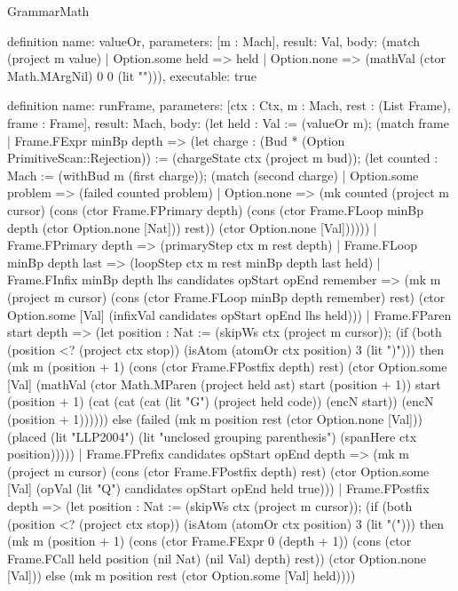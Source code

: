 \begin{lexlean}{GrammarMath}
\begin{semanticmodule}
{{{definition{
  name: valueOr,
  parameters: [m : Mach],
  result: Val,
  body: (match (project m value)
    | Option.some held => held
    | Option.none => (mathVal (ctor Math.MArgNil) 0 0 (lit ""))),
  executable: true
}

definition{
  name: runFrame,
  parameters: [ctx : Ctx, m : Mach, rest : (List Frame), frame : Frame],
  result: Mach,
  body: (let held : Val := (valueOr m); (match frame
    | Frame.FExpr minBp depth => (let charge : (Bud * (Option PrimitiveScan::Rejection)) := (chargeState ctx (project m bud)); (let counted : Mach := (withBud m (first charge)); (match (second charge)
      | Option.some problem => (failed counted problem)
      | Option.none => (mk counted (project m cursor) (cons (ctor Frame.FPrimary depth) (cons (ctor Frame.FLoop minBp depth (ctor Option.none [Nat])) rest)) (ctor Option.none [Val])))))
    | Frame.FPrimary depth => (primaryStep ctx m rest depth)
    | Frame.FLoop minBp depth last => (loopStep ctx m rest minBp depth last held)
    | Frame.FInfix minBp depth lhs candidates opStart opEnd remember => (mk m (project m cursor) (cons (ctor Frame.FLoop minBp depth remember) rest) (ctor Option.some [Val] (infixVal candidates opStart opEnd lhs held)))
    | Frame.FParen start depth => (let position : Nat := (skipWs ctx (project m cursor)); (if (both (position <? (project ctx stop)) (isAtom (atomOr ctx position) 3 (lit ")"))) then (mk m (position + 1) (cons (ctor Frame.FPostfix depth) rest) (ctor Option.some [Val] (mathVal (ctor Math.MParen (project held ast) start (position + 1)) start (position + 1) (cat (cat (cat (lit "G") (project held code)) (encN start)) (encN (position + 1)))))) else (failed (mk m position rest (ctor Option.none [Val])) (placed (lit "LLP2004") (lit "unclosed grouping parenthesis") (spanHere ctx position)))))
    | Frame.FPrefix candidates opStart opEnd depth => (mk m (project m cursor) (cons (ctor Frame.FPostfix depth) rest) (ctor Option.some [Val] (opVal (lit "Q") candidates opStart opEnd held true)))
    | Frame.FPostfix depth => (let position : Nat := (skipWs ctx (project m cursor)); (if (both (position <? (project ctx stop)) (isAtom (atomOr ctx position) 3 (lit "("))) then (mk m (position + 1) (cons (ctor Frame.FExpr 0 (depth + 1)) (cons (ctor Frame.FCall held position (nil Nat) (nil Val) depth) rest)) (ctor Option.none [Val])) else (mk m position rest (ctor Option.some [Val] held))))
}}}}
\end{semanticmodule}
\end{lexlean}
